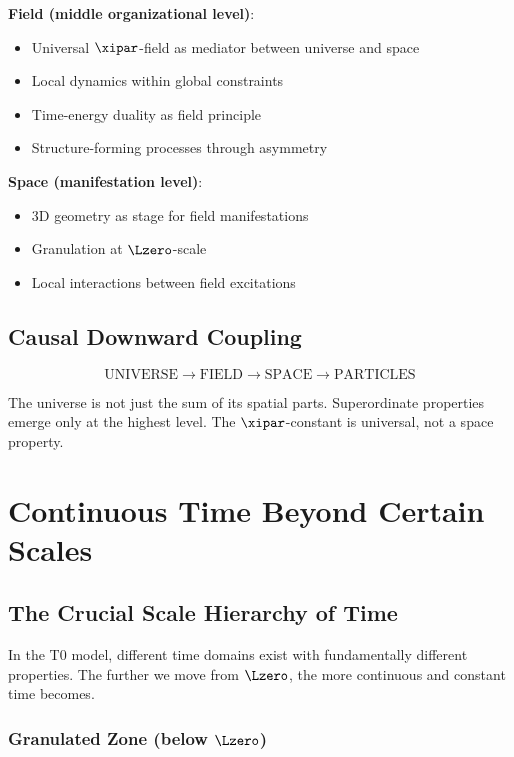 	\textbf{Field (middle organizational level)}:
	\begin{itemize}
		\item Universal $\xipar$-field as mediator between universe and space
		\item Local dynamics within global constraints
		\item Time-energy duality as field principle
		\item Structure-forming processes through asymmetry
	\end{itemize}
	
	\textbf{Space (manifestation level)}:
	\begin{itemize}
		\item 3D geometry as stage for field manifestations
		\item Granulation at $\Lzero$-scale
		\item Local interactions between field excitations
	\end{itemize}
	
	\subsection{Causal Downward Coupling}
	
	\begin{equation}
		\text{UNIVERSE} \rightarrow \text{FIELD} \rightarrow \text{SPACE} \rightarrow \text{PARTICLES}
	\end{equation}
	
	The universe is not just the sum of its spatial parts. Superordinate properties emerge only at the highest level. The $\xipar$-constant is universal, not a space property.
	
	\section{Continuous Time Beyond Certain Scales}
	
	\subsection{The Crucial Scale Hierarchy of Time}
	
	In the T0 model, different time domains exist with fundamentally different properties. The further we move from $\Lzero$, the more continuous and constant time becomes.
	
	\subsubsection{Granulated Zone (below $\Lzero$)}
	
